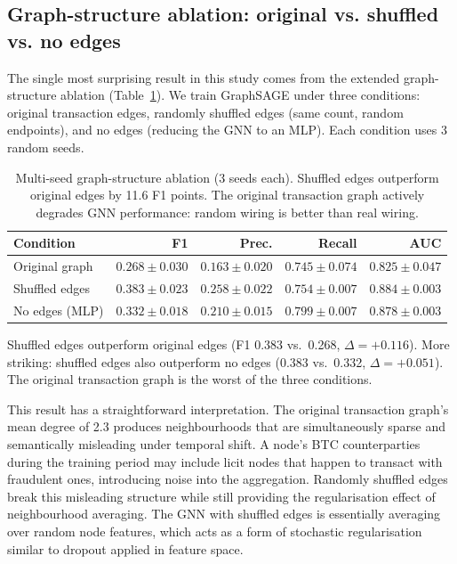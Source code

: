 \subsection{Graph-structure ablation: original vs. shuffled vs. no edges}
\label{sec:graph_ablation}

The single most surprising result in this study comes from the extended
graph-structure ablation (Table~\ref{tab:graph_ablation_extended}).
We train GraphSAGE under three conditions: original transaction edges,
randomly shuffled edges (same count, random endpoints), and no edges
(reducing the GNN to an MLP).  Each condition uses 3 random seeds.

\begin{table}[!htbp]
\centering
\caption{Multi-seed graph-structure ablation (3 seeds each).
  Shuffled edges outperform original edges by 11.6 F1 points.  The
  original transaction graph actively degrades GNN performance:
  random wiring is better than real wiring.}
\label{tab:graph_ablation_extended}
\small
\begin{tabular}{lrrrr}
\toprule
\textbf{Condition} & \textbf{F1} & \textbf{Prec.}
  & \textbf{Recall} & \textbf{AUC} \\
\midrule
Original graph
  & $0.268 \pm 0.030$ & $0.163 \pm 0.020$
  & $0.745 \pm 0.074$ & $0.825 \pm 0.047$ \\
Shuffled edges
  & $\mathbf{0.383 \pm 0.023}$ & $\mathbf{0.258 \pm 0.022}$
  & $\mathbf{0.754 \pm 0.007}$ & $\mathbf{0.884 \pm 0.003}$ \\
No edges (MLP)
  & $0.332 \pm 0.018$ & $0.210 \pm 0.015$
  & $0.799 \pm 0.007$ & $0.878 \pm 0.003$ \\
\bottomrule
\end{tabular}
\end{table}

Shuffled edges outperform original edges (F1 0.383 vs.\ 0.268,
$\Delta = +0.116$).  More striking: shuffled edges also outperform
no edges (0.383 vs.\ 0.332, $\Delta = +0.051$).  The original
transaction graph is the worst of the three conditions.

This result has a straightforward interpretation.  The original
transaction graph's mean degree of 2.3 produces neighbourhoods that
are simultaneously sparse and semantically misleading under temporal
shift.  A node's BTC counterparties during the training period may
include licit nodes that happen to transact with fraudulent ones,
introducing noise into the aggregation.  Randomly shuffled edges break
this misleading structure while still providing the regularisation
effect of neighbourhood averaging.  The GNN with shuffled edges is
essentially averaging over random node features, which acts as a
form of stochastic regularisation similar to dropout applied in
feature space.

